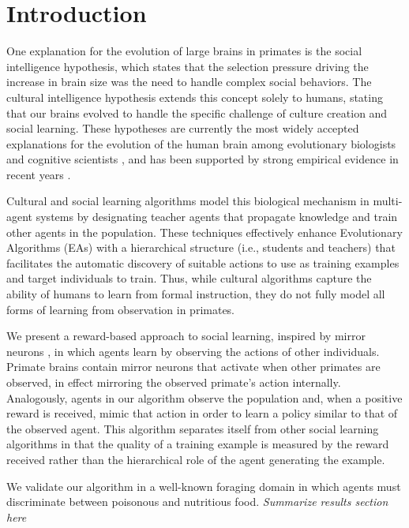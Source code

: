 \documentclass{acm_proc_article-sp}
\begin{document}
\section{Introduction}

One explanation for the evolution of large brains in primates is the social intelligence hypothesis, which states that the selection pressure driving the increase in brain size was the need to handle complex social behaviors. The cultural intelligence hypothesis extends this concept solely to humans, stating that our brains evolved to handle the specific challenge of culture creation and social learning. These hypotheses are currently the most widely accepted explanations for the evolution of the human brain among evolutionary biologists and cognitive scientists \cite{holekamp2007questioning}, and has been supported by strong empirical evidence in recent years \cite{herrmann2007humans}.

Cultural and social learning algorithms \cite{reynolds1994introduction} model this biological mechanism in multi-agent systems by designating teacher agents that propagate knowledge and train other agents in the population. These techniques effectively enhance Evolutionary Algorithms (EAs) with a hierarchical structure (i.e., students and teachers) that facilitates the automatic discovery of suitable actions to use as training examples and target individuals to train. Thus, while cultural algorithms capture the ability of humans to learn from formal instruction, they do not fully model all forms of learning from observation in primates.

We present a reward-based approach to social learning, inspired by mirror neurons \cite{gallese-98}, in which agents learn by observing the actions of other individuals. Primate brains contain mirror neurons that activate when other primates are observed, in effect mirroring the observed primate's action internally. Analogously, agents in our algorithm observe the population and, when a positive reward is received, mimic that action in order to learn a policy similar to that of the observed agent. This algorithm separates itself from other social learning algorithms in that the quality of a training example is measured by the reward received rather than the hierarchical role of the agent generating the example.

We validate our algorithm in a well-known foraging domain in which agents must discriminate between poisonous and nutritious food. \textit{Summarize results section here}
\end{document}
